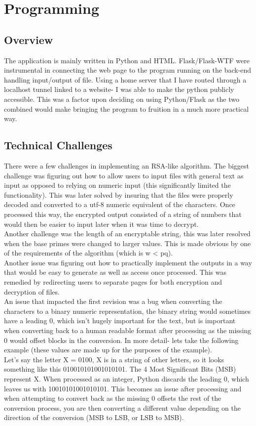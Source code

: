\documentclass[a4paper]{article}
\begin{document}
\section{Programming}
\subsection{Overview}      
The application is mainly written in Python and HTML. Flask/Flask-WTF were instrumental in connecting the web page to the program running on the back-end handling input/output of file.
Using a home server that I have routed through a localhost tunnel linked to a website- I was able to make the python publicly accessible. This was a factor upon deciding on using Python/Flask as the two combined would make bringing the program to fruition in a much more practical way. 
\subsection{Technical Challenges}
There were a few challenges in implementing an RSA-like algorithm. The biggest challenge was figuring out how to allow users to input files with general text as input as opposed to relying on numeric input (this significantly limited the functionality). This was later solved by insuring that the files were properly decoded and converted to a utf-8 numeric equivalent of the characters. Once processed this way, the encrypted output consisted of a string of numbers that would then be easier to input later when it was time to decrypt. \\
Another challenge was the length of an encryptable string, this was later resolved when the base primes were changed to larger values. This is made obvious by one of the requirements of the algorithm (which is w < pq). \\
Another issue was figuring out how to practically implement the outputs in a way that would be easy to generate as well as access once processed. This was remedied by redirecting users to separate pages for both encryption and decryption of files. \\
An issue that impacted the first revision was a bug when converting the characters to a binary numeric representation, the binary string would sometimes have a leading 0, which isn't hugely important for the text, but is important when converting back to a human readable format after processing as the missing 0 would offset blocks in the conversion. In more detail- lets take the following example (these values are made up for the purposes of the example). \\ Let's say the letter X = 0100, X is in a string of other letters, so it looks something like this 010010101001010101. The 4 Most Significant Bits (MSB) represent X. When processed as an integer, Python discards the leading 0, which leaves us with 10010101001010101. This becomes an issue after processing and when attempting to convert back as the missing 0 offsets the rest of the conversion process, you are then converting a different value depending on the direction of the conversion (MSB to LSB, or LSB to MSB).
\end{document}
